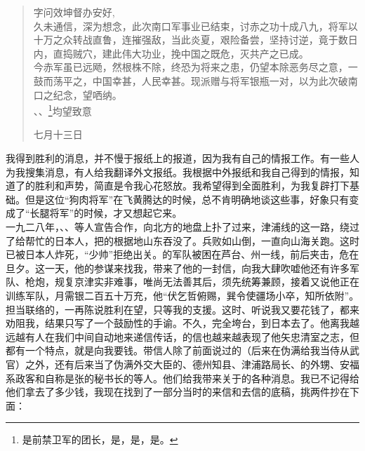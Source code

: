 \begin{quote}
	字问效坤督办安好,\\

久未通信，深为想念，此次南口军事业已结束，讨赤之功十成八九，将军以十万之众转战直鲁，连摧强敌，当此炎夏，艰险备尝，坚持讨逆，竟于数日内，直捣贼穴，建此伟大功业，挽中国之既危，灭共产之已成。\\

今赤军虽已远飏，然根株不除，终恐为将来之患，仍望本除恶务尽之意，一鼓而荡平之，中国幸甚，人民幸甚。现派赠与将军银瓶一对，以为此次破南口之纪念，望哂纳。\\

、、\footnote{是前禁卫军的团长，是，是，是。}均望致意\\

\begin{flushright}
	七月十三日\\
\end{flushright}
\end{quote}

我得到胜利的消息，并不慢于报纸上的报道，因为我有自己的情报工作。有一些人为我搜集消息，有人给我翻译外文报纸。我根据中外报纸和我自己得到的情报，知道了的胜利和声势，简直是令我心花怒放。我希望得到全面胜利，为我复辟打下基础。但是这位“狗肉将军”在飞黄腾达的时候，总不肯明确地谈这些事，好象只有变成了“长腿将军”的时候，才又想起它来。\\

一九二八年，、、等人宣告合作，向北方的地盘上扑了过来，津浦线的这一路，绕过了给帮忙的日本人，把的根据地山东吞没了。兵败如山倒，一直向山海关跑。这时已被日本人炸死，“少帅”拒绝出关。的军队被困在芦台、州一线，前后夹击，危在旦夕。这一天，他的参谋来找我，带来了他的一封信，向我大肆吹嘘他还有许多军队、枪炮，规复京津实非难事，唯尚无法善其后，须先统筹兼顾，接着又说他正在训练军队，月需银二百五十万充，他“伏乞哲俯赐，巽令使疆场小卒，知所依附”。担当联络的，一再陈说胜利在望，只等我的支援。这时、听说我又要花钱了，都来劝阻我，结果只写了一个鼓励性的手谕。不久，完全垮台，到日本去了。他离我越远越有人在我们中间自动地来递信传话，的信也越来越表现了他矢忠清室之志，但都有一个特点，就是向我要钱。带信人除了前面说过的（后来在伪满给我当侍从武官）之外，还有后来当了伪满外交大臣的、德州知县、津浦路局长、的外甥、安福系政客和自称是张的秘书长的等人。他们给我带来关于的各种消息。我已不记得给他们拿去了多少钱，我现在找到了一部分当时的来信和去信的底稿，挑两件抄在下面：\\

